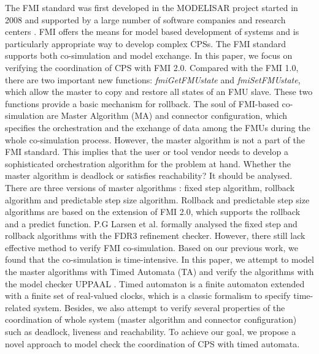 The FMI standard was first developed in the MODELISAR project started in 2008 and supported by a large number of software companies and research centers \cite{ClauMODELISAR}. FMI offers the means for model based development of systems and is particularly appropriate way to develop complex CPSs. The FMI standard supports both co-simulation and  model exchange. In this paper, we focus on verifying the coordination of CPS with FMI 2.0. Compared with the FMI 1.0, there are two important new functions: \emph{fmiGetFMUstate} and \emph{fmiSetFMUstate}, which allow the master to copy and restore all states of an FMU slave. These two functions provide a basic mechanism for rollback. The soul of FMI-based co-simulation are Master Algorithm (MA) \cite{AckerDVM15} and connector configuration, which specifies the orchestration and the exchange of data among the FMUs during the whole co-simulation process. However, the master algorithm is not a part of the FMI standard. This implies that the user or tool vendor needs to develop a sophisticated orchestration algorithm for the problem at hand. Whether the master algorithm is deadlock or satisfies reachability? It should be analysed. There are three versions of master algorithms \cite{BromanBGLMTW13}: fixed step algorithm, rollback algorithm and predictable step size algorithm. Rollback and predictable step size algorithms are based on the extension of FMI 2.0, which supports the rollback and a predict function. P.G Larsen et al. \cite{Larsen2016Integrated} formally analysed the fixed step and rollback algorithms with the FDR3 refinement checker. However, there still lack effective method to verify FMI co-simulation. Based on our previous work, we found that the co-simulation is time-intensive. In this paper, we attempt to model the master algorithms with Timed Automata (TA) and verify the algorithms with the model checker UPPAAL \cite{BehrmannDLHPYH06}. Timed automaton is a finite automaton extended with a finite set of real-valued clocks, which is a classic formalism to specify time-related system. Besides, we also attempt to verify several properties of the coordination of whole system (master algorithm and connector configuration) such as deadlock, liveness and reachability. To achieve our goal, we propose a novel approach to model check the coordination of CPS with timed automata.

